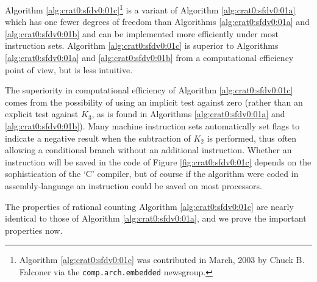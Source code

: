 Algorithm \ref{alg:crat0:sfdv0:01c}\footnote{Algorithm \ref{alg:crat0:sfdv0:01c} 
was contributed in March, 2003
by Chuck B. Falconer \cite{bibref:i:chuckbfalconer}
via the
\texttt{comp.arch.embedded} \cite{bibref:n:comparchembedded} 
newsgroup.}
is a variant of Algorithm \ref{alg:crat0:sfdv0:01a} 
which has one fewer
degrees of freedom than Algorithms \ref{alg:crat0:sfdv0:01a} 
and \ref{alg:crat0:sfdv0:01b} and can be implemented
more efficiently under most instruction sets.  Algorithm \ref{alg:crat0:sfdv0:01c} 
is superior to Algorithms \ref{alg:crat0:sfdv0:01a} 
and \ref{alg:crat0:sfdv0:01b}
from a computational efficiency
point of view, but is less intuitive.

The superiority in computational efficiency of Algorithm \ref{alg:crat0:sfdv0:01c} 
comes from the possibility of using an implicit test against zero 
(rather than an explicit
test against $K_3$, as is found in Algorithms \ref{alg:crat0:sfdv0:01a} 
and \ref{alg:crat0:sfdv0:01b}).
Many machine instruction sets automatically set flags to indicate a negative
result when the 
subtraction of $K_2$ is performed, thus often allowing a conditional branch
without an additional instruction.  Whether an instruction will be saved in
the code of Figure \ref{fig:crat0:sfdv0:01c} depends on the sophistication
of the `C' compiler, but of course if the algorithm were coded in
assembly-language an instruction could be saved on most processors.

The properties of rational counting Algorithm \ref{alg:crat0:sfdv0:01c} are nearly
identical to those of Algorithm \ref{alg:crat0:sfdv0:01a}, 
and we prove the important properties
now.

